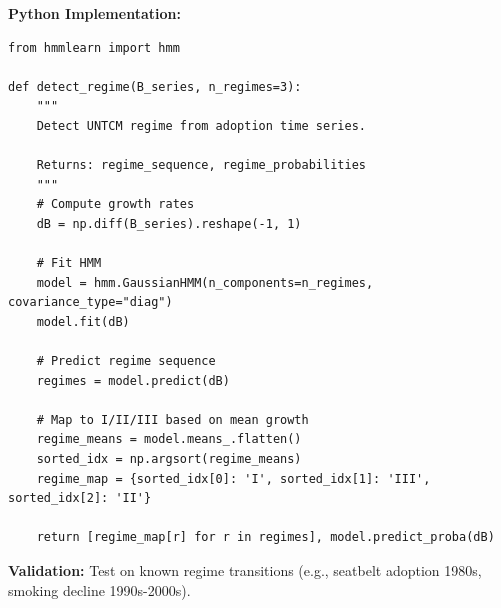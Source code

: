 \begin{tcolorbox}[colback=blue!5!white, colframe=blue!75!black,
    title=\textbf{Application UNTCM-E1: Regime Detection}]
\textbf{Python Implementation:}
\begin{verbatim}
from hmmlearn import hmm

def detect_regime(B_series, n_regimes=3):
    """
    Detect UNTCM regime from adoption time series.

    Returns: regime_sequence, regime_probabilities
    """
    # Compute growth rates
    dB = np.diff(B_series).reshape(-1, 1)

    # Fit HMM
    model = hmm.GaussianHMM(n_components=n_regimes, covariance_type="diag")
    model.fit(dB)

    # Predict regime sequence
    regimes = model.predict(dB)

    # Map to I/II/III based on mean growth
    regime_means = model.means_.flatten()
    sorted_idx = np.argsort(regime_means)
    regime_map = {sorted_idx[0]: 'I', sorted_idx[1]: 'III', sorted_idx[2]: 'II'}

    return [regime_map[r] for r in regimes], model.predict_proba(dB)
\end{verbatim}

\textbf{Validation:} Test on known regime transitions (e.g., seatbelt adoption 1980s, smoking decline 1990s-2000s).

\end{tcolorbox}


